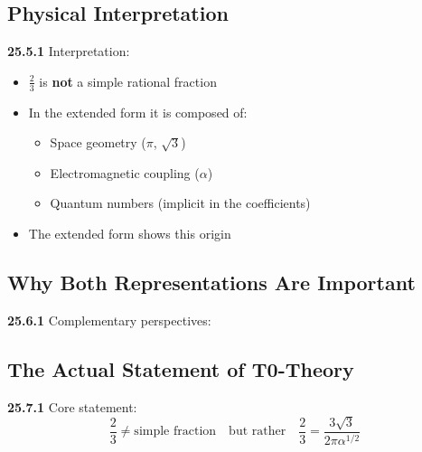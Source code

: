 \subsection{Physical Interpretation}

\noindent \textbf{25.5.1} Interpretation:
\begin{itemize}
	\item $\frac{2}{3}$ is \textbf{not} a simple rational fraction
	\item In the extended form it is composed of:
	\begin{itemize}
		\item Space geometry ($\pi$, $\sqrt{3}$)
		\item Electromagnetic coupling ($\alpha$)
		\item Quantum numbers (implicit in the coefficients)
	\end{itemize}
	\item The extended form shows this origin
\end{itemize}

\subsection{Why Both Representations Are Important}

\noindent \textbf{25.6.1} Complementary perspectives:


\subsection{The Actual Statement of T0-Theory}

\noindent \textbf{25.7.1} Core statement:
\[
\boxed{
	\frac{2}{3} \neq \text{simple fraction} \quad \text{but rather} \quad \frac{2}{3} = \frac{3\sqrt{3}}{2\pi\alpha^{1/2}}
}
\]

